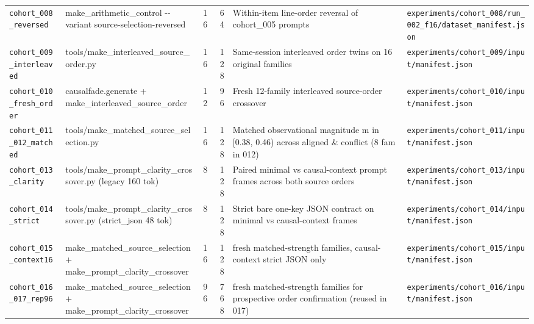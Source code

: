 {\begin{longtable}{@{}>{\raggedright\arraybackslash}p{2.6cm}>{\raggedright\arraybackslash}p{2.3cm}rr>{\raggedright\arraybackslash}p{4.6cm}>{\raggedright\arraybackslash}p{3.2cm}@{}}
\texttt{cohort\_008\_reversed} & make\_arithmetic\_control -\allowbreak{}-\allowbreak{}variant source-\allowbreak{}selection-\allowbreak{}reversed & 16 & 64 & Within-\allowbreak{}item line-\allowbreak{}order reversal of cohort\_005 prompts & \texttt{experiments/\allowbreak{}cohort\_008/\allowbreak{}run\_002\_f16/\allowbreak{}dataset\_manifest.json} \\[2pt]
\texttt{cohort\_009\_interleaved} & tools/\allowbreak{}make\_interleaved\_source\_order.py & 16 & 128 & Same-\allowbreak{}session interleaved order twins on 16 original families & \texttt{experiments/\allowbreak{}cohort\_009/\allowbreak{}input/\allowbreak{}manifest.json} \\[2pt]
\texttt{cohort\_010\_fresh\_order} & causalfade.generate + make\_interleaved\_source\_order & 12 & 96 & Fresh 12-\allowbreak{}family interleaved source-\allowbreak{}order crossover & \texttt{experiments/\allowbreak{}cohort\_010/\allowbreak{}input/\allowbreak{}manifest.json} \\[2pt]
\texttt{cohort\_011\_012\_matched} & tools/\allowbreak{}make\_matched\_source\_selection.py & 16 & 128 & Matched observational magnitude m in [0.38, 0.46) across aligned \& conflict (8 fam in 012) & \texttt{experiments/\allowbreak{}cohort\_011/\allowbreak{}input/\allowbreak{}manifest.json} \\[2pt]
\texttt{cohort\_013\_clarity} & tools/\allowbreak{}make\_prompt\_clarity\_crossover.py (legacy 160 tok) & 8 & 128 & Paired minimal vs causal-\allowbreak{}context prompt frames across both source orders & \texttt{experiments/\allowbreak{}cohort\_013/\allowbreak{}input/\allowbreak{}manifest.json} \\[2pt]
\texttt{cohort\_014\_strict} & tools/\allowbreak{}make\_prompt\_clarity\_crossover.py (strict\_json 48 tok) & 8 & 128 & Strict bare one-\allowbreak{}key JSON contract on minimal vs causal-\allowbreak{}context frames & \texttt{experiments/\allowbreak{}cohort\_014/\allowbreak{}input/\allowbreak{}manifest.json} \\[2pt]
\texttt{cohort\_015\_context16} & make\_matched\_source\_selection + make\_prompt\_clarity\_crossover & 16 & 128 & 16 fresh matched-\allowbreak{}strength families, causal-\allowbreak{}context strict JSON only & \texttt{experiments/\allowbreak{}cohort\_015/\allowbreak{}input/\allowbreak{}manifest.json} \\[2pt]
\texttt{cohort\_016\_017\_rep96} & make\_matched\_source\_selection + make\_prompt\_clarity\_crossover & 96 & 768 & 96 fresh matched-\allowbreak{}strength families for prospective order confirmation (reused in 017) & \texttt{experiments/\allowbreak{}cohort\_016/\allowbreak{}input/\allowbreak{}manifest.json} \\[2pt]

\end{longtable}}
